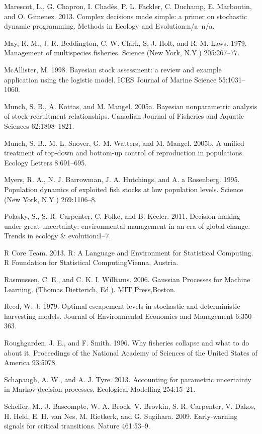 \documentclass[author-year, 12pt,review]{components/elsarticle} %
\begin{document}
Marescot, L., G. Chapron, I. Chadès, P. L. Fackler, C. Duchamp, E.
Marboutin, and O. Gimenez. 2013. Complex decisions made simple: a primer
on stochastic dynamic programming. Methods in Ecology and
Evolution:n/a--n/a.

May, R. M., J. R. Beddington, C. W. Clark, S. J. Holt, and R. M. Laws.
1979. Management of multispecies fisheries. Science (New York, N.Y.)
205:267--77.

McAllister, M. 1998. Bayesian stock assessment: a review and example
application using the logistic model. ICES Journal of Marine Science
55:1031--1060.

Munch, S. B., A. Kottas, and M. Mangel. 2005a. Bayesian nonparametric
analysis of stock-recruitment relationships. Canadian Journal of
Fisheries and Aquatic Sciences 62:1808--1821.

Munch, S. B., M. L. Snover, G. M. Watters, and M. Mangel. 2005b. A
unified treatment of top-down and bottom-up control of reproduction in
populations. Ecology Letters 8:691--695.

Myers, R. A., N. J. Barrowman, J. A. Hutchings, and A. a Rosenberg.
1995. Population dynamics of exploited fish stocks at low population
levels. Science (New York, N.Y.) 269:1106--8.

Polasky, S., S. R. Carpenter, C. Folke, and B. Keeler. 2011.
Decision-making under great uncertainty: environmental management in an
era of global change. Trends in ecology \& evolution:1--7.

R Core Team. 2013. R: A Language and Environment for Statistical
Computing. R Foundation for Statistical ComputingVienna, Austria.

Rasmussen, C. E., and C. K. I. Williams. 2006. Gaussian Processes for
Machine Learning. (Thomas Dietterich, Ed.). MIT Press,Boston.

Reed, W. J. 1979. Optimal escapement levels in stochastic and
deterministic harvesting models. Journal of Environmental Economics and
Management 6:350--363.

Roughgarden, J. E., and F. Smith. 1996. Why fisheries collapse and what
to do about it. Proceedings of the National Academy of Sciences of the
United States of America 93:5078.

Schapaugh, A. W., and A. J. Tyre. 2013. Accounting for parametric
uncertainty in Markov decision processes. Ecological Modelling
254:15--21.

Scheffer, M., J. Bascompte, W. A. Brock, V. Brovkin, S. R. Carpenter, V.
Dakos, H. Held, E. H. van Nes, M. Rietkerk, and G. Sugihara. 2009.
Early-warning signals for critical transitions. Nature 461:53--9.
\end{document}
